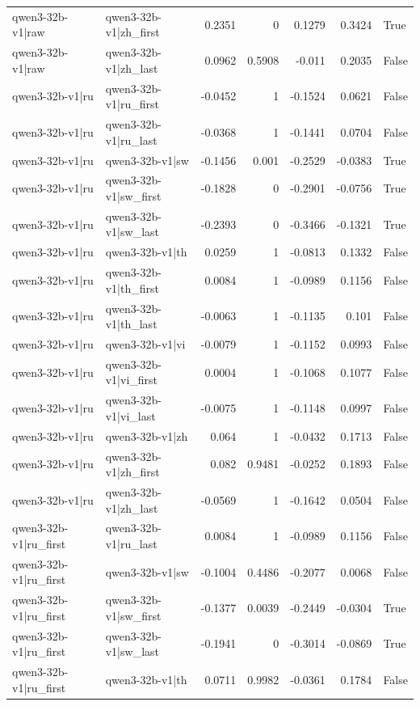 \begin{table}
\begin{tabular}{l l r r r r l}
qwen3-32b-v1|raw & qwen3-32b-v1|zh_first & 0.2351 & 0 & 0.1279 & 0.3424 & True \\
qwen3-32b-v1|raw & qwen3-32b-v1|zh_last & 0.0962 & 0.5908 & -0.011 & 0.2035 & False \\
qwen3-32b-v1|ru & qwen3-32b-v1|ru_first & -0.0452 & 1 & -0.1524 & 0.0621 & False \\
qwen3-32b-v1|ru & qwen3-32b-v1|ru_last & -0.0368 & 1 & -0.1441 & 0.0704 & False \\
qwen3-32b-v1|ru & qwen3-32b-v1|sw & -0.1456 & 0.001 & -0.2529 & -0.0383 & True \\
qwen3-32b-v1|ru & qwen3-32b-v1|sw_first & -0.1828 & 0 & -0.2901 & -0.0756 & True \\
qwen3-32b-v1|ru & qwen3-32b-v1|sw_last & -0.2393 & 0 & -0.3466 & -0.1321 & True \\
qwen3-32b-v1|ru & qwen3-32b-v1|th & 0.0259 & 1 & -0.0813 & 0.1332 & False \\
qwen3-32b-v1|ru & qwen3-32b-v1|th_first & 0.0084 & 1 & -0.0989 & 0.1156 & False \\
qwen3-32b-v1|ru & qwen3-32b-v1|th_last & -0.0063 & 1 & -0.1135 & 0.101 & False \\
qwen3-32b-v1|ru & qwen3-32b-v1|vi & -0.0079 & 1 & -0.1152 & 0.0993 & False \\
qwen3-32b-v1|ru & qwen3-32b-v1|vi_first & 0.0004 & 1 & -0.1068 & 0.1077 & False \\
qwen3-32b-v1|ru & qwen3-32b-v1|vi_last & -0.0075 & 1 & -0.1148 & 0.0997 & False \\
qwen3-32b-v1|ru & qwen3-32b-v1|zh & 0.064 & 1 & -0.0432 & 0.1713 & False \\
qwen3-32b-v1|ru & qwen3-32b-v1|zh_first & 0.082 & 0.9481 & -0.0252 & 0.1893 & False \\
qwen3-32b-v1|ru & qwen3-32b-v1|zh_last & -0.0569 & 1 & -0.1642 & 0.0504 & False \\
qwen3-32b-v1|ru_first & qwen3-32b-v1|ru_last & 0.0084 & 1 & -0.0989 & 0.1156 & False \\
qwen3-32b-v1|ru_first & qwen3-32b-v1|sw & -0.1004 & 0.4486 & -0.2077 & 0.0068 & False \\
qwen3-32b-v1|ru_first & qwen3-32b-v1|sw_first & -0.1377 & 0.0039 & -0.2449 & -0.0304 & True \\
qwen3-32b-v1|ru_first & qwen3-32b-v1|sw_last & -0.1941 & 0 & -0.3014 & -0.0869 & True \\
qwen3-32b-v1|ru_first & qwen3-32b-v1|th & 0.0711 & 0.9982 & -0.0361 & 0.1784 & False \\

\end{tabular}
\end{table}
